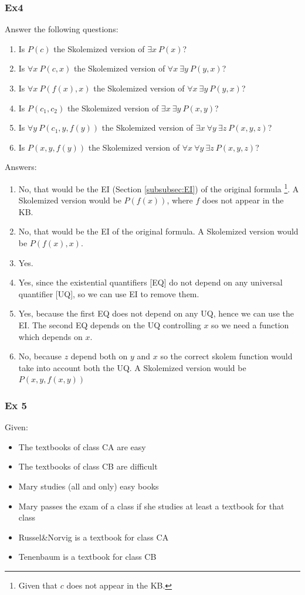 \documentclass[10pt,a4paper]{article}
\begin{document}
\subsubsection{Ex4}
Answer the following questions:
\begin{enumerate}
\item  Is $P(c)$ the Skolemized version of $\exists x\ P(x)$?
\item  Is $\forall x\ P(c,x)$ the Skolemized version of $\forall x\ \exists y\ P(y,x)$?
\item  Is $\forall x\ P(f(x),x)$ the Skolemized version of $\forall x\ \exists y\ P(y,x)$?
\item  Is $P(c_1,c_2)$ the Skolemized version of $\exists x\ \exists y\ P(x,y)$?
\item  Is $\forall y\ P(c_1,y,f(y))$ the Skolemized version of $\exists x\ \forall y\ \exists z\ P(x,y,z)$?
\item  Is $P(x,y,f(y))$ the Skolemized version of $\forall x\ \forall y\ \exists z\ P(x,y,z)$?
\end{enumerate}

Answers:
\begin{enumerate}
\item No, that would be the EI (Section \ref{subsubsec:EI}) of the original formula \footnote{Given that $c$ does not appear in the KB.}. A Skolemized version would be $P(f(x))$, where $f$ does not appear in the KB.
\item No, that would be the EI of the original formula. A Skolemized version would be $P(f(x),x)$.
\item Yes.
\item Yes, since the existential quantifiers [EQ] do not depend on any universal quantifier [UQ], so we can use EI to remove them.
\item Yes, because the first EQ does not depend on any UQ, hence we can use the EI. The second  EQ depends on the UQ controlling $x$ so we need a function which depends on $x$.
\item No, because $z$ depend both on $y$ and $x$ so the correct skolem function would take into account both the UQ. A Skolemized version would be $P(x,y,f(x,y))$
\end{enumerate}

\subsubsection{Ex 5}
Given:
\begin{itemize}
\item The textbooks of class CA are easy
\item The textbooks of class CB are difficult
\item  Mary studies (all and only) easy books
\item  Mary passes the exam of a class if she studies at least a textbook for that class
\item  Russel&Norvig is a textbook for class CA
\item  Tenenbaum is a textbook for class CB
\end{itemize}
\end{document}
